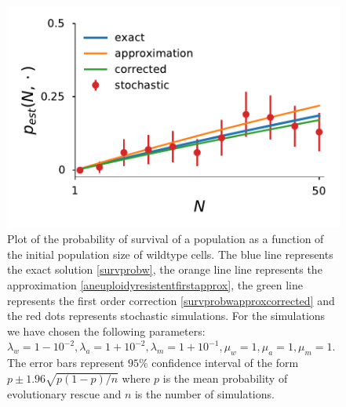 \documentclass[12pt]{extarticle}
\begin{document}
\begin{figure}[!t]
 \vspace*{1\baselineskip}
\includegraphics[width=1\textwidth]{Figures/SurvPlotNData.pdf}
\caption{Plot of the probability of survival of a population as a function of the initial population size of wildtype cells. The blue line represents the exact solution \eqref{survprobw}, the orange line line represents the approximation \eqref{aneuploidyresistentfirstapprox}, the green line represents the first order correction \eqref{survprobwapproxcorrected} and the red dots represents stochastic simulations. For the simulations we have chosen the following parameters: $\lambda_w=1-10^{-2}, \lambda_a=1+10^{-2},\lambda_m=1+10^{-1},\mu_w=1,\mu_a=1,\mu_m=1$. The error bars represent $95\%$ confidence interval of the form $p\pm1.96\sqrt{p\left(1-p\right)/n}$ where $p$ is the mean probability of evolutionary rescue and $n$ is the number of simulations.}
\label{SurvPlotNData}
\end{figure}
\end{document}
